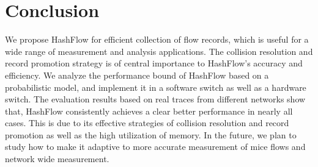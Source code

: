 \section{Conclusion}
\label{section:conclusion}
We propose HashFlow for efficient collection of flow records, 
which is useful for a wide range of measurement and analysis applications. 
The collision resolution and record promotion strategy is of central importance 
to HashFlow's accuracy and efficiency. We analyze the performance bound 
of HashFlow based on a probabilistic model, and implement it in a software switch as well as a hardware switch. 
The evaluation results based on real traces from different networks show that, 
HashFlow consistently achieves a clear better performance in nearly all cases. 
This is due to its effective strategies of collision resolution and record promotion as well as the high utilization of memory.
In the future, we plan to study how to make it adaptive to more accurate measurement of mice flows and network wide measurement.
